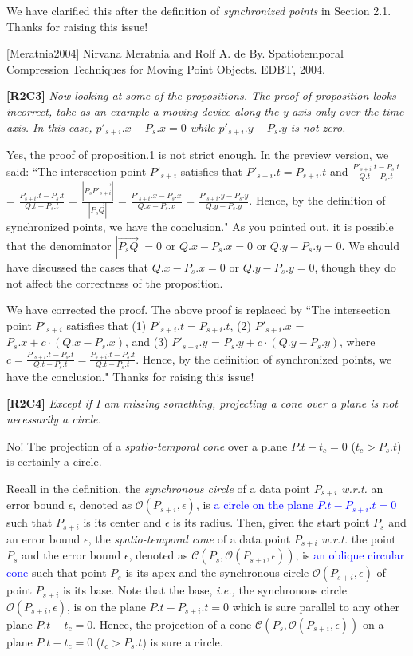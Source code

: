 \documentclass{letter}
\newcommand{\ie}{\emph{i.e.,}\xspace}
\newcommand{\wrt}{\emph{w.r.t.}\xspace}
\newcommand{\cone}[1]{{$\mathcal{C}{#1}$}}
\renewcommand{\circle}[1]{{$\mathcal{O}{#1}$}}
\begin{document}
We have clarified this after the definition of \emph{synchronized points} in Section 2.1. Thanks for raising this issue!

[Meratnia2004] Nirvana Meratnia and Rolf A. de By. Spatiotemporal Compression Techniques for Moving Point Objects. EDBT, 2004.


\textbf{[R2C3]} \emph{Now looking at some of the propositions.
The proof of proposition looks incorrect, take as an example a moving device along the y-axis only over the time axis. In this case, $p'_{s+i}.x - P_s.x = 0$ while $p'_{s+i}.y - P_s.y$ is not zero.
}

Yes, the proof of proposition.1 is not strict enough. In the preview version, we said:
``The intersection point $P'_{s+i}$ satisfies that $P'_{s+i}.t = P_{s+i}.t$ and
$\frac{P'_{s+i}.t - P_{s}.t}{Q.t - P_{s}.t}$ = $\frac{P_{s+i}.t - P_{s}.t}{Q.t - P_{s}.t}$  =
$\frac{|\overrightarrow{P_sP'_{s+i}}|}{|\overrightarrow{P_sQ}|}$ =
$\frac{P'_{s+i}.x - P_{s}.x}{Q.x - P_{s}.x}$ =
$\frac{P'_{s+i}.y - P_{s}.y}{Q.y - P_{s}.y}$.
Hence, by the definition of synchronized points, we have the conclusion."
As you pointed out, it is possible that the denominator $|\overrightarrow{P_sQ}|=0$ or $Q.x - P_{s}.x=0$ or $Q.y - P_{s}.y=0$. We should have discussed the cases that $Q.x - P_{s}.x=0$ or $Q.y - P_{s}.y=0$, though they do not affect the correctness of the proposition.

We have corrected the proof. The above proof is replaced by
``The intersection point $P'_{s+i}$ satisfies that
(1) $P'_{s+i}.t = P_{s+i}.t$,
(2) $P'_{s+i}.x$ = $P_s.x +  c\cdot(Q.x - P_s.x)$, and
(3) $P'_{s+i}.y$ = $P_s.y +  c\cdot(Q.y - P_s.y)$,
where $c= \frac{P'_{s+i}.t - P_{s}.t}{Q.t - P_{s}.t}= \frac{P_{s+i}.t-P_s.t}{Q.t-P_s.t}$.
Hence, by the definition of synchronized points, we have the conclusion."
Thanks for raising this issue!


\textbf{[R2C4]} \emph{Except if I am missing something, projecting a cone over a plane is not necessarily a circle.}

No! The projection of a \emph{spatio-temporal cone} over a plane $P.t- t_c = 0$ ($t_c > P_s.t$) is certainly a circle.

Recall in the definition, the \emph{synchronous circle} of a data point $P_{s+i}$ \wrt an error bound $\epsilon$, denoted as \circle{(P_{s+i}, \epsilon)}, is \textcolor{blue}{a circle on the plane $P.t-P_{s+i}.t = 0$} such that $P_{s+i}$ is its center and $\epsilon$ is its radius.
%
Then, given the start point $P_s$ and an error bound $\epsilon$, the \emph{spatio-temporal cone} of a data point $P_{s+i}$ \wrt the point $P_s$ and the error bound $\epsilon$, denoted as \cone{(P_s, \mathcal{O}(P_{s+i}, \epsilon))}, is \textcolor{blue}{an oblique circular cone} such that point $P_s$ is its apex and the synchronous circle $\mathcal{O}(P_{s+i}, \epsilon)$ of point $P_{s+i}$ is its base. Note that the base, \ie the synchronous circle $\mathcal{O}(P_{s+i}, \epsilon)$, is on the plane $P.t-P_{s+i}.t = 0$ which is sure parallel to any other plane $P.t- t_c = 0$. Hence, the  projection of a cone \cone{(P_s, \mathcal{O}(P_{s+i}, \epsilon))} on a plane $P.t- t_c = 0$ ($t_c > P_s.t$) is sure a circle.
\end{document}
